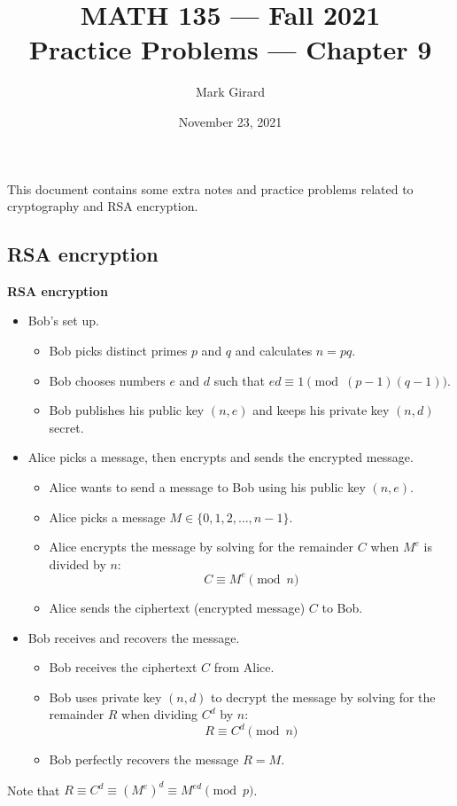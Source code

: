 \documentclass[11pt]{article}
\date{November 23, 2021}
\theoremstyle{plain}
\theoremstyle{definition}
\newif\ifshowsolution
\begin{document}
\title{MATH 135 --- Fall 2021\\ Practice Problems \ifshowsolution(Solutions)\fi  --- Chapter 9}
\author{Mark Girard}

\maketitle
\noindent This document contains some extra notes and practice problems related to cryptography and RSA encryption.

\subsection*{RSA encryption}

\begin{tcolorbox}
\textbf{RSA encryption}
\begin{itemize}
 \item Bob's set up.
 \begin{itemize}
  \item Bob picks distinct primes $p$ and $q$ and calculates $n=pq$.
  \item Bob chooses numbers $e$ and $d$ such that $ed\equiv 1\pmod{(p-1)(q-1)}$.
  \item Bob publishes his public key $(n,e)$ and keeps his private key $(n,d)$ secret. 
 \end{itemize}
 \item Alice picks a message, then encrypts and sends the encrypted message.
  \begin{itemize}
  \item Alice wants to send a message to Bob using his public key $(n,e)$.
  \item Alice picks a message $M\in\{0,1,2,\dots,n-1\}$.
  \item Alice encrypts the message by solving for the remainder $C$ when $M^e$ is divided by $n$:
  \[
   C \equiv M^e\pmod{n}
  \]
  \item Alice sends the ciphertext (encrypted message) $C$ to Bob.
 \end{itemize}
 \item Bob receives and recovers the message.
  \begin{itemize}
  \item Bob receives the ciphertext $C$ from Alice.
  \item Bob uses private key $(n,d)$ to decrypt the message by solving for the remainder $R$ when dividing $C^d$ by $n$:
  \[
   R \equiv C^d\pmod{n}
  \]
  \item Bob perfectly recovers the message $R=M$.
 \end{itemize}
\end{itemize}
Note that $R\equiv C^d \equiv (M^e)^d \equiv M^{ed} \pmod{p}$. 
\end{tcolorbox}
\end{document}
